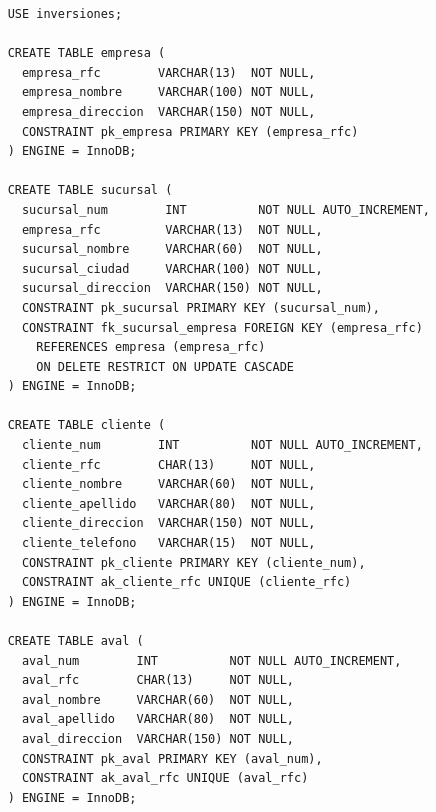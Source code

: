 \begin{verbatim}
	USE inversiones;

	CREATE TABLE empresa (
	  empresa_rfc        VARCHAR(13)  NOT NULL,
	  empresa_nombre     VARCHAR(100) NOT NULL,
	  empresa_direccion  VARCHAR(150) NOT NULL,
	  CONSTRAINT pk_empresa PRIMARY KEY (empresa_rfc)
	) ENGINE = InnoDB;

	CREATE TABLE sucursal (
	  sucursal_num        INT          NOT NULL AUTO_INCREMENT,
	  empresa_rfc         VARCHAR(13)  NOT NULL,
	  sucursal_nombre     VARCHAR(60)  NOT NULL,
	  sucursal_ciudad     VARCHAR(100) NOT NULL,
	  sucursal_direccion  VARCHAR(150) NOT NULL,
	  CONSTRAINT pk_sucursal PRIMARY KEY (sucursal_num),
	  CONSTRAINT fk_sucursal_empresa FOREIGN KEY (empresa_rfc)
	    REFERENCES empresa (empresa_rfc)
	    ON DELETE RESTRICT ON UPDATE CASCADE
	) ENGINE = InnoDB;

	CREATE TABLE cliente (
	  cliente_num        INT          NOT NULL AUTO_INCREMENT,
	  cliente_rfc        CHAR(13)     NOT NULL,
	  cliente_nombre     VARCHAR(60)  NOT NULL,
	  cliente_apellido   VARCHAR(80)  NOT NULL,
	  cliente_direccion  VARCHAR(150) NOT NULL,
	  cliente_telefono   VARCHAR(15)  NOT NULL,
	  CONSTRAINT pk_cliente PRIMARY KEY (cliente_num),
	  CONSTRAINT ak_cliente_rfc UNIQUE (cliente_rfc)
	) ENGINE = InnoDB;

	CREATE TABLE aval (
	  aval_num        INT          NOT NULL AUTO_INCREMENT,
	  aval_rfc        CHAR(13)     NOT NULL,
	  aval_nombre     VARCHAR(60)  NOT NULL,
	  aval_apellido   VARCHAR(80)  NOT NULL,
	  aval_direccion  VARCHAR(150) NOT NULL,
	  CONSTRAINT pk_aval PRIMARY KEY (aval_num),
	  CONSTRAINT ak_aval_rfc UNIQUE (aval_rfc)
	) ENGINE = InnoDB;


\end{verbatim}
